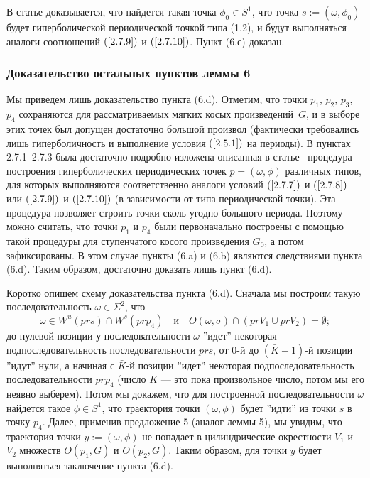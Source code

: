 \documentclass[12pt]{article}
\begin{document}
В статье \cite{17} доказывается, что найдется такая точка $\phi_0\in S^1$, что точка $s:=(\omega,\phi_0)$ будет гиперболической периодической точкой типа (1,2), и будут выполняться аналоги соотношений $(\ref{2.7.9})$ и $(\ref{2.7.10})$.
Пункт (6.с) доказан.

\subsubsection{Доказательство остальных пунктов леммы 6}

Мы приведем лишь доказательство пункта (6.d). 
Отметим, что точки $p_1$, $p_2$, $p_3$, $p_4$ сохраняются для рассматриваемых мягких косых произведений~$G$, и в выборе этих точек был допущен достаточно большой произвол (фактически требовались лишь гиперболичность и выполнение условия $(\ref{2.5.1})$ на периоды). В пунктах 2.7.1--2.7.3 была достаточно подробно изложена описанная в статье~\cite{17} процедура построения гиперболических периодических точек $p=(\omega,\phi)$ различных типов, для которых выполняются соответственно аналоги условий $(\ref{2.7.7})$ и $(\ref{2.7.8})$ или $(\ref{2.7.9})$ и $(\ref{2.7.10})$ (в зависимости от типа периодической точки). Эта процедура позволяет строить точки сколь угодно большого периода. Поэтому можно считать, что точки $p_1$ и $p_4$ были первоначально построены с помощью такой процедуры для ступенчатого косого произведения $G_0$, а потом зафиксированы. В этом случае пункты (6.a) и (6.b) являются следствиями пункта (6.d). Таким образом, достаточно доказать лишь пункт (6.d).

Коротко опишем схему доказательства пункта (6.d).
Сначала мы построим такую последовательность $\omega\in\Sigma^2$, что 
$$\omega\in W^u(pr s)\cap W^s(pr p_4)\quad\textrm{и}\quad O(\omega, \sigma)\cap (pr V_1\cup pr V_2)=\emptyset;$$
до нулевой позиции у последовательности $\omega$ ''идет'' некоторая подпоследовательность последовательности $pr s$, от $0$-й до $(\bar{K}-1)$-й позиции ''идут'' нули, а начиная с $\bar{K}$-й позиции ''идет'' некоторая подпоследовательность последовательности $pr p_4$ (число $\bar{K}$ --- это пока произвольное число, потом мы его неявно выберем).
Потом мы докажем, что для построенной последовательности $\omega$ найдется такое $\phi\in S^1$, что траектория точки $(\omega,\phi)$ будет ''идти'' из точки $s$ в точку $p_4$. Далее, применив предложение 5 (аналог леммы 5), мы увидим, что траектория точки $y:=(\omega,\phi)$ не попадает в цилиндрические окрестности $V_1$ и $V_2$ множеств $O(p_1,G)$ и $O(p_2,G)$. Таким образом, для точки $y$ будет выполняться заключение пункта (6.d). 
\end{document}
